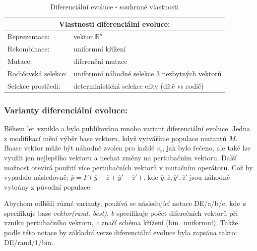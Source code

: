 \begin{table}[h]\centering
\begin{tabular}{ l l }
    \multicolumn{2}{c}{Vlastnosti diferenciální evoluce:} \\
    \hline
    Reprezentace: & vektor $\mathbb{R}^n$ \\
    \hline  
    Rekombinace: & uniformní křížení \\
    \hline  
    Mutace: & diferenční mutace \\
    \hline   
    Rodičovská selekce: & uniformní náhodné selekce 3 nezbytných vektorů \\
    \hline   
    Selekce prostředí: & deterministická selekce elity (dítě vs rodič) \\
  \end{tabular}
\caption{Diferenciální evoluce - souhrnné vlastnosti}
\end{table} 
\par
\subsubsection{Varianty diferenciální evoluce:}
Během let vzniklo a bylo publikováno mnoho variant diferenciální evoluce. Jedna z modifikací mění výběr base vektoru, když vytváříme populace mutantů $M$. Baase vektor může být náhodně zvolen pro každé $v_i$, jak bylo řečeno, ale také lze využít jen nejlepšího vektoru a nechat změny na pertubačním vektoru. Další možnost otevírá použití více pertubačních vektorů v mutačním operátoru. Což by vypadalo následovně: 
$\overline{p} = F (\overline{y}-\overline{z} + \overline{y}' - \overline{z}')$, kde $\overline{y}, \overline{z}, \overline{y}',\overline{z}'$ jsou náhodně vybrány z původní populace.\par
Abychom odlišili různé varianty, používá se následující notace DE/a/b/c, kde \textit{a} specifikuje base \textit{vektor(rand, best)}, \textit{b} specifikuje počet diferečních  vektorů při vzniku pertubačního vektoru, \textit{c} značí schéma křížení (bin=uniformní). Takže podle této notace by základní verze diferenciální evoluce byla zapsána takto: DE/rand/1/bin. 
